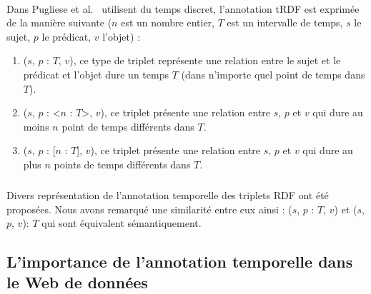 \paragraph{}
Dans Pugliese et al.~\cite{pugliese2008} utilisent du temps discret, l’annotation tRDF est exprimée de la manière suivante ($n$ est un nombre entier, $T$ est un intervalle de temps, $s$ le sujet, $p$ le prédicat, $v$ l'objet) :
\begin{enumerate}
\item ($s$, $p$ : {$T$}, $v$), ce type de triplet représente une relation entre le sujet et le prédicat et l'objet dure un temps $T$ (dans n'importe quel point de temps dans $T$).
\item ($s$, $p$ : <$n$ : $T$>, $v$), ce triplet présente une relation entre $s$, $p$ et $v$ qui dure au moins $n$ point de temps différents dans $T$.
\item ($s$, $p$ : [$n$ : $T$], $v$), ce triplet présente une relation entre $s$, $p$ et $v$ qui dure au plus $n$ points de temps différents dans $T$.
\end{enumerate}
\subparagraph{} 
Divers représentation de l'annotation temporelle des triplets RDF ont été proposées. Nous avons remarqué une similarité entre eux ainsi : ($s$, $p$ : {$T$}, $v$) et ($s$, $p$, $v$): $T$ qui sont équivalent sémantiquement.	
\subsection{L'importance de l'annotation temporelle dans le Web de données}
